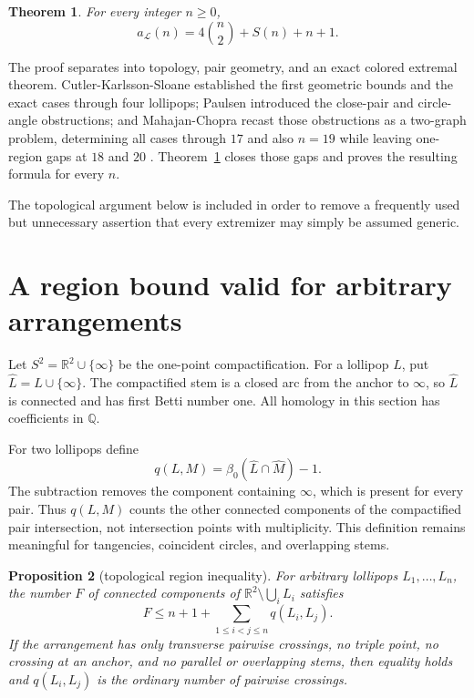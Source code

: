 \documentclass[11pt]{article}
\theoremstyle{plain}
\newtheorem{theorem}{Theorem}[section]
\newtheorem{proposition}[theorem]{Proposition}
\theoremstyle{definition}
\theoremstyle{remark}
\newcommand{\Lop}{\mathcal L}
\newcommand{\R}{\mathbb R}
\newcommand{\Q}{\mathbb Q}
\newcommand{\1}{\mathbf 1}
\newcommand{\betti}{\beta}
\begin{document}
\begin{theorem}\label{thm:main}
For every integer $n\geq0$,
\begin{equation}\label{eq:main}
 a_{\Lop}(n)=4\binom n2+S(n)+n+1.
\end{equation}
\end{theorem}

The proof separates into topology, pair geometry, and an exact colored
extremal theorem.  Cutler-Karlsson-Sloane established the first geometric
bounds and the exact cases through four lollipops; Paulsen introduced the
close-pair and circle-angle obstructions; and Mahajan-Chopra recast those
obstructions as a two-graph problem, determining all cases through $17$ and
also $n=19$ while leaving one-region gaps at $18$ and $20$
\cite{CKS,MahajanChopra,Paulsen}.  Theorem~\ref{thm:main} closes those gaps
and proves the resulting formula for every $n$.

The topological argument below is included in order to remove a frequently
used but unnecessary assertion that every extremizer may simply be assumed
generic.

\section{A region bound valid for arbitrary arrangements}\label{sec:topology}

Let $S^2=\R^2\cup\{\infty\}$ be the one-point compactification.  For a
lollipop $L$, put $\widehat L=L\cup\{\infty\}$.  The compactified stem is a
closed arc from the anchor to $\infty$, so $\widehat L$ is connected and has
first Betti number one.  All homology in this section has coefficients in
$\Q$.

For two lollipops define
\begin{equation}\label{eq:qdef}
 q(L,M)=\betti_0(\widehat L\cap\widehat M)-1.
\end{equation}
The subtraction removes the component containing $\infty$, which is present
for every pair.  Thus $q(L,M)$ counts the other connected components of the
compactified pair intersection, not intersection points with multiplicity.
This definition remains meaningful for tangencies, coincident circles, and
overlapping stems.

\begin{proposition}[topological region inequality]\label{prop:top-region}
For arbitrary lollipops $L_1,\ldots,L_n$, the number $F$ of connected
components of
$\R^2\setminus\bigcup_iL_i$ satisfies
\begin{equation}\label{eq:top-region}
 F\leq n+1+\sum_{1\leq i<j\leq n}q(L_i,L_j).
\end{equation}
If the arrangement has only transverse pairwise crossings, no triple point,
no crossing at an anchor, and no parallel or overlapping stems, then equality
holds and $q(L_i,L_j)$ is the ordinary number of pairwise crossings.
\end{proposition}
\end{document}
